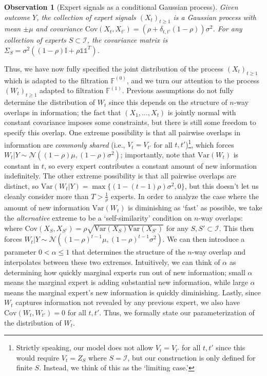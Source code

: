\documentclass{winnower}
\newtheorem{observation}{Observation}
\begin{document}
\begin{observation}[Expert signals as a conditional Gaussian process]
    Given outcome $Y$, the collection of expert signals $\left( X_t \right)_{t\geq 1}$ is a Gaussian process with mean $\pm \mu$ and covariance $\text{Cov}(X_t, X_{t'}) = (\rho + \delta_{t, t'}(1-\rho)) \sigma^2$. For any collection of experts $S \subset \mathcal{I}$, the covariance matrix is $\Sigma_S = \sigma^2((1-\rho)\mathbb{I} + \rho\mathds{1}\mathds{1}^T)$.
\end{observation}

Thus, we have now fully specified the joint distribution of the process $\left( X_t \right)_{t\geq 1}$ which is adapted to the filtration $\mathbb{F}^{(0)}$, and we turn our attention to the process $\left( W_t\right)_{t\geq 1}$ adapted to filtration $\mathbb{F}^{(1)}$. Previous assumptions do not fully determine the distribution of $W_t$ since this depends on the structure of $n$-way overlaps in information; the fact that $(X_1, \ldots, X_t)$ is jointly normal with constant covariance imposes some constraints, but there is still some freedom to specify this overlap. One extreme possibility is that all pairwise overlaps in information are \emph{commonly shared} (i.e., $V_t = V_{t'}$ for all $t, t'$)\footnote{Strictly speaking, our model does not allow $V_t = V_{t'}$ for all $t, t'$ since this would require $V_t = Z_S$ where $S = \mathcal{I}$, but our construction is only defined for finite $S$. Instead, we think of this as the `limiting case.'}, which forces $W_t|Y \sim \mathcal{N}\left((1-\rho)\mu, (1-\rho)\sigma^2\right)$; importantly, note that $\text{Var}(W_t)$ is constant in $t$, so every expert contributes a constant amount of new information indefinitely. The other extreme possibility is that all pairwise overlaps are distinct, so $\text{Var}(W_t | Y) = \max\{ (1-(t-1)\rho)\sigma^2, 0\}$, but this doesn't let us cleanly consider more than $T >  \frac{1}{\rho}$ experts. In order to analyze the case where the amount of new information $\text{Var}(W_t)$ is diminishing as `fast' as possible, we take the \emph{alternative} extreme to be a `self-similarity' condition on $n$-way overlaps: where $\text{Cov}({X}_S, {X}_{S'}) = \rho \sqrt{\text{Var}({X}_S)\text{Var}({X}_{S'})}$ for any $S, S' \subset \mathcal{I}$. This then forces $W_t|Y \sim \mathcal{N}\left((1-\rho)^{t-1}\mu, (1-\rho)^{t-1}\sigma^2\right)$. We can then introduce a parameter $0 < \alpha \leq 1$ that determines the structure of the $n$-way overlap and interpolates between these two extremes. Intuitively, we can think of $\alpha$ as determining how quickly marginal experts run out of new information; small $\alpha$ means the marginal expert is adding substantial new information, while large $\alpha$ means the marginal expert's new information is quickly diminishing. Lastly, since $W_t$ captures information not revealed by any previous expert, we also have  $\text{Cov}(W_t, W_{t'}) = 0$ for all $t, t'$. Thus, we formally state our parameterization of the distribution of $W_t$.
\end{document}
